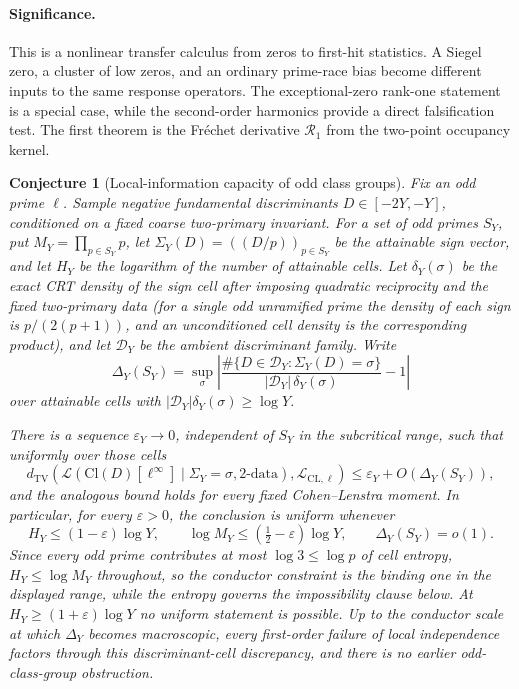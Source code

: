 \documentclass[11pt]{article}
\newtheorem{conjecture}{Conjecture}
\theoremstyle{definition}
\newcommand{\eps}{\varepsilon}
\begin{document}
\paragraph{Significance.}
This is a nonlinear transfer calculus from zeros to first-hit statistics.  A Siegel zero,
a cluster of low zeros, and an ordinary prime-race bias become different inputs to the
same response operators.  The exceptional-zero rank-one statement is a special case,
while the second-order harmonics provide a direct falsification test.  The first theorem
is the Fr\'echet derivative $\mathcal R_1$ from the two-point occupancy kernel.

\begin{conjecture}[Local-information capacity of odd class groups]\label{s10}
Fix an odd prime $\ell$.  Sample negative fundamental discriminants
$D\in[-2Y,-Y]$, conditioned on a fixed coarse two-primary invariant.  For a set of
odd primes $S_Y$, put $M_Y=\prod_{p\in S_Y}p$, let $\Sigma_Y(D)=((D/p))_{p\in S_Y}$ be the
attainable sign vector, and let $H_Y$ be the logarithm of the number of attainable cells.
Let $\delta_Y(\sigma)$ be the exact CRT density of the sign cell after imposing quadratic reciprocity and the fixed two-primary data (for a single odd unramified prime the density of each sign is $p/(2(p+1))$, and an unconditioned cell density is the corresponding product), and let $\mathcal D_Y$ be the
ambient discriminant family.  Write
\[
 \Delta_Y(S_Y)=\sup_\sigma
 \left|\frac{\#\{D\in\mathcal D_Y:\Sigma_Y(D)=\sigma\}}
 {|\mathcal D_Y|\,\delta_Y(\sigma)}-1\right|
\]
over attainable cells with $|\mathcal D_Y|\delta_Y(\sigma)\ge\log Y$.

There is a sequence $\varepsilon_Y\to0$, independent of $S_Y$ in the subcritical range,
such that uniformly over those cells
\[
 d_{\mathrm{TV}}\!\left(
 \mathcal L(\mathrm{Cl}(D)[\ell^\infty]\mid\Sigma_Y=\sigma,\text{2-data}),
 \mathcal L_{\mathrm{CL},\ell}\right)
 \le \varepsilon_Y+O(\Delta_Y(S_Y)),
\]
and the analogous bound holds for every fixed Cohen--Lenstra moment.  In particular,
for every $\eps>0$, the conclusion is uniform whenever
\[
 H_Y\le(1-\eps)\log Y,
 \qquad \log M_Y\le(\tfrac12-\eps)\log Y,
 \qquad \Delta_Y(S_Y)=o(1).
\]
Since every odd prime contributes at most $\log3\le\log p$ of cell entropy,
$H_Y\le\log M_Y$ throughout, so
the conductor constraint is the binding one in the displayed range, while the entropy
governs the impossibility clause below.
At $H_Y\ge(1+\eps)\log Y$ no uniform statement is possible.  Up to the conductor scale
at which $\Delta_Y$ becomes macroscopic, every first-order failure of local independence
factors through this discriminant-cell discrepancy, and there is no earlier
odd-class-group obstruction.
\end{conjecture}
\end{document}
